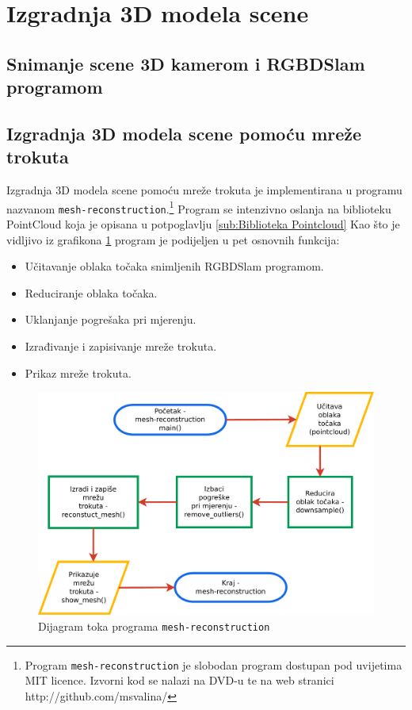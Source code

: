\newpage

\section{Izgradnja 3D modela scene} %
\label{sec:Izgradnja 3D modela scene}

\subsection{Snimanje scene 3D kamerom i RGBDSlam programom} %
\label{sub:Snimanje scene 3D kamerom i RGBDSlam programom}


\subsection{Izgradnja 3D modela scene pomoću mreže trokuta} %
\label{sub:Izgradnja 3D modela scene pomoću mreže trokuta}

Izgradnja 3D modela scene pomoću mreže trokuta je implementirana u
programu nazvanom \texttt{mesh-reconstruction}.\footnote{
Program \texttt{mesh-reconstruction} je slobodan program dostupan pod
uvijetima MIT licence. Izvorni kod se nalazi na DVD-u te na web stranici
http://github.com/msvalina/}      
Program se intenzivno oslanja na biblioteku PointCloud koja je opisana u
potpoglavlju \ref{sub:Biblioteka Pointcloud} Kao što je vidljivo iz
grafikona \ref{fig:flowchart} program je podijeljen u pet osnovnih
funkcija:
\begin{itemize}
    \item Učitavanje oblaka točaka snimljenih RGBDSlam programom.
    \item Reduciranje oblaka točaka.
    \item Uklanjanje pogrešaka pri mjerenju.
    \item Izrađivanje i zapisivanje mreže trokuta.
    \item Prikaz mreže trokuta.
\end{itemize}

\begin{figure}[h]
\renewcommand{\figurename}{Grafikon}
\centering
\includegraphics[scale=0.5]{figures/flowchart.pdf}
\caption{Dijagram toka programa \texttt{mesh-reconstruction} }
\label{fig:flowchart}
\end{figure}

